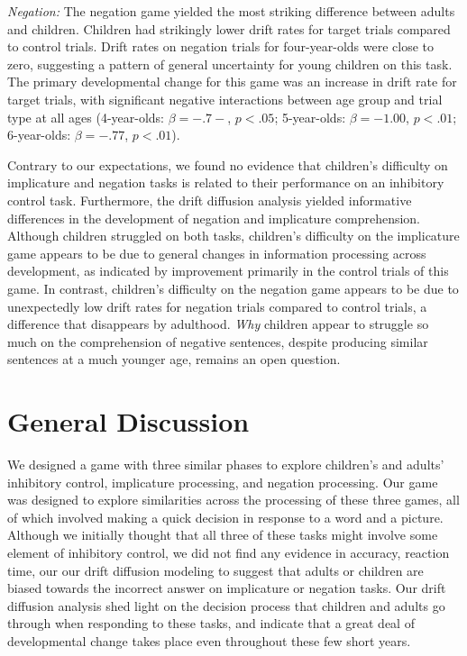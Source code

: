 \documentclass[10pt,letterpaper]{article}
\begin{document}
\emph{Negation:}  The negation game yielded the most striking difference between adults and children.  Children had strikingly lower drift rates for target trials compared to control trials.  Drift rates on negation trials for four-year-olds were close to zero, suggesting a pattern of general uncertainty for young children on this task.  The primary developmental change for this game was an increase in drift rate for target trials, with significant negative interactions between age group and trial type at all ages (4-year-olds: $\beta = -.7-$, $p <.05$; 5-year-olds: $\beta = -1.00$, $p <.01$; 6-year-olds: $\beta = -.77$, $p <.01$).  

Contrary to our expectations, we found no evidence that children's difficulty on implicature and negation tasks is related to their performance on an inhibitory control task.  Furthermore, the drift diffusion analysis yielded informative differences in the development of negation and implicature comprehension.  Although children struggled on both tasks, children's difficulty on the implicature game appears to be due to general changes in information processing across development, as indicated by improvement primarily in the control trials of this game.  In contrast, children's difficulty on the negation game appears to be due to unexpectedly low drift rates for negation trials compared to control trials, a difference that disappears by adulthood.  \emph{Why} children appear to struggle so much on the comprehension of negative sentences, despite producing similar sentences at a much younger age, remains an open question.  


\section{General Discussion}

We designed a game with three similar phases to explore children's and adults' inhibitory control, implicature processing, and negation processing.  Our game was designed to explore similarities across the processing of these three games, all of which involved making a quick decision in response to a word and a picture.  Although we initially thought that all three of these tasks might involve some element of inhibitory control, we did not find any evidence in accuracy, reaction time, our our drift diffusion modeling to suggest that adults or children are biased towards the incorrect answer on implicature or negation tasks.  Our drift diffusion analysis shed light on the decision process that children and adults go through when responding to these tasks, and indicate that a great deal of developmental change takes place even throughout these few short years.
\end{document}
